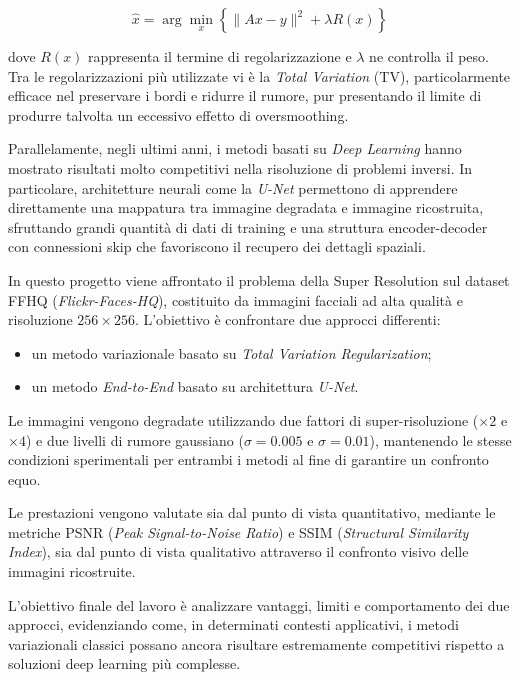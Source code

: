 \documentclass{article}
\begin{document}
\[
\hat{x} =
\arg\min_x
\left\{
\|Ax - y\|^2 + \lambda R(x)
\right\}
\]

dove \(R(x)\) rappresenta il termine di regolarizzazione e \(\lambda\) ne controlla il peso. Tra le regolarizzazioni più utilizzate vi è la \textit{Total Variation} (TV), particolarmente efficace nel preservare i bordi e ridurre il rumore, pur presentando il limite di produrre talvolta un eccessivo effetto di oversmoothing.

Parallelamente, negli ultimi anni, i metodi basati su \textit{Deep Learning} hanno mostrato risultati molto competitivi nella risoluzione di problemi inversi. In particolare, architetture neurali come la \textit{U-Net} permettono di apprendere direttamente una mappatura tra immagine degradata e immagine ricostruita, sfruttando grandi quantità di dati di training e una struttura encoder-decoder con connessioni skip che favoriscono il recupero dei dettagli spaziali.

In questo progetto viene affrontato il problema della Super Resolution sul dataset FFHQ (\textit{Flickr-Faces-HQ}), costituito da immagini facciali ad alta qualità e risoluzione \(256 \times 256\). L’obiettivo è confrontare due approcci differenti:

\begin{itemize}
    \item un metodo variazionale basato su \textit{Total Variation Regularization};
    \item un metodo \textit{End-to-End} basato su architettura \textit{U-Net}.
\end{itemize}

Le immagini vengono degradate utilizzando due fattori di super-risoluzione (\(\times 2\) e \(\times 4\)) e due livelli di rumore gaussiano (\(\sigma = 0.005\) e \(\sigma = 0.01\)), mantenendo le stesse condizioni sperimentali per entrambi i metodi al fine di garantire un confronto equo.

Le prestazioni vengono valutate sia dal punto di vista quantitativo, mediante le metriche PSNR (\textit{Peak Signal-to-Noise Ratio}) e SSIM (\textit{Structural Similarity Index}), sia dal punto di vista qualitativo attraverso il confronto visivo delle immagini ricostruite.

L’obiettivo finale del lavoro è analizzare vantaggi, limiti e comportamento dei due approcci, evidenziando come, in determinati contesti applicativi, i metodi variazionali classici possano ancora risultare estremamente competitivi rispetto a soluzioni deep learning più complesse.
\end{document}
